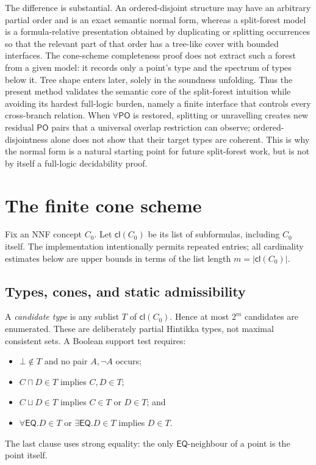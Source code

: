 \documentclass[11pt]{article}
\theoremstyle{plain}
\theoremstyle{definition}
\theoremstyle{remark}
\newcommand{\EQ}{\ensuremath{\mathsf{EQ}}}
\newcommand{\PO}{\ensuremath{\mathsf{PO}}}
\newcommand{\cl}{\ensuremath{\mathsf{cl}}}
\begin{document}
The difference is substantial.  An ordered-disjoint structure may have an
arbitrary partial order and is an exact semantic normal form, whereas a
split-forest model is a formula-relative presentation obtained by duplicating
or splitting occurrences so that the relevant part of that order has a
tree-like cover with bounded interfaces.  The cone-scheme completeness proof
does not extract such a forest from a given model: it records only a point's
type and the spectrum of types below it.  Tree shape enters later, solely in
the soundness unfolding.  Thus the present method validates the semantic core
of the split-forest intuition while avoiding its hardest full-logic burden,
namely a finite interface that controls every cross-branch relation.  When
$\forall\PO$ is restored, splitting or unravelling creates new residual
$\PO$ pairs that a universal overlap restriction can observe; ordered-
disjointness alone does not show that their target types are coherent.  This
is why the normal form is a natural starting point for future split-forest
work, but is not by itself a full-logic decidability proof.

\section{The finite cone scheme}
\label{sec:scheme}

Fix an NNF concept $C_0$.  Let $\cl(C_0)$ be its list of subformulas, including
$C_0$ itself.  The implementation intentionally permits repeated entries; all
cardinality estimates below are upper bounds in terms of the list length
$m=|\cl(C_0)|$.

\subsection{Types, cones, and static admissibility}

A \emph{candidate type} is any sublist $T$ of $\cl(C_0)$.  Hence at most
$2^m$ candidates are enumerated.  These are deliberately partial Hintikka
types, not maximal consistent sets.  A Boolean support test requires:
\begin{itemize}
  \item $\bot\notin T$ and no pair $A,\neg A$ occurs;
  \item $C\sqcap D\in T$ implies $C,D\in T$;
  \item $C\sqcup D\in T$ implies $C\in T$ or $D\in T$; and
  \item $\forall\EQ.D\in T$ or $\exists\EQ.D\in T$ implies $D\in T$.
\end{itemize}
The last clause uses strong equality: the only $\EQ$-neighbour of a point is
the point itself.
\end{document}
